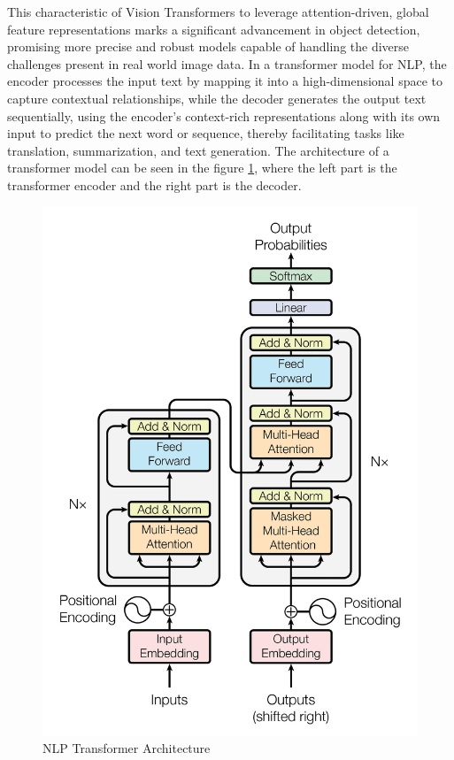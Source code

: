 This characteristic of Vision Transformers to leverage attention-driven, global feature representations marks a significant advancement in object detection, promising 
more precise and robust models capable of handling the diverse challenges present in real world image data. In a transformer model for NLP, the encoder processes 
the input text by mapping it into a high-dimensional space to capture contextual relationships, while the decoder generates the output text sequentially, using the 
encoder's context-rich representations along with its own input to predict the next word or sequence, thereby facilitating tasks like translation, summarization, 
and text generation. The architecture of a transformer model can be seen in the figure \ref{fig:tr-base}, where the left part is the transformer encoder and the 
right part is the decoder.


\begin{figure}[h!]
    \centering
    \includegraphics[scale=0.15]{Figures/transformer_basis.jpg}
    \caption{NLP Transformer Architecture \cite{visiontr}}
    \label{fig:tr-base}
\end{figure}


